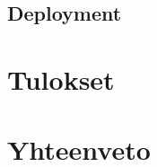 \documentclass{tktltiki}
\begin{document}
\subsection{Deployment}


\clearpage
\section{Tulokset}

\clearpage
\section{Yhteenveto}


\nocite{*}
%
%


%

\clearpage


\lastpage

\appendices
\end{document}
